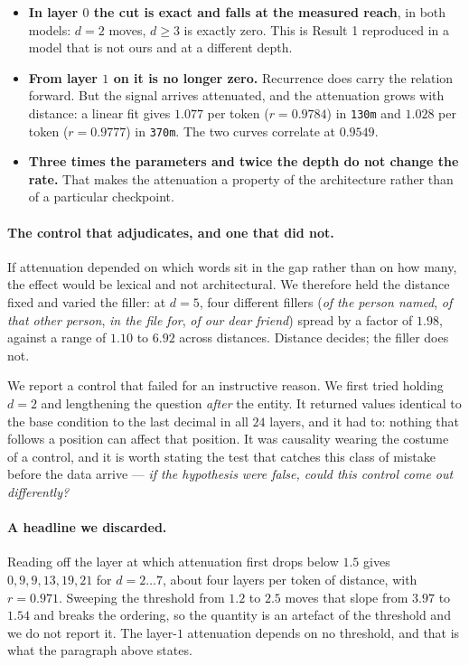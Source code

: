 \documentclass[11pt,a4paper]{article}
\begin{document}
\begin{itemize}
\item \textbf{In layer $0$ the cut is exact and falls at the measured reach}, in both models: $d{=}2$
moves, $d \ge 3$ is exactly zero. This is Result 1 reproduced in a model that is not ours and at a
different depth.
\item \textbf{From layer $1$ on it is no longer zero.} Recurrence does carry the relation forward.
But the signal arrives attenuated, and the attenuation grows with distance: a linear fit gives
$1.077$ per token ($r = 0.9784$) in \texttt{130m} and $1.028$ per token ($r = 0.9777$) in
\texttt{370m}. The two curves correlate at $0.9549$.
\item \textbf{Three times the parameters and twice the depth do not change the rate.} That makes the
attenuation a property of the architecture rather than of a particular checkpoint.
\end{itemize}

\paragraph{The control that adjudicates, and one that did not.} If attenuation depended on which words
sit in the gap rather than on how many, the effect would be lexical and not architectural. We
therefore held the distance fixed and varied the filler: at $d{=}5$, four different fillers
(\emph{of the person named}, \emph{of that other person}, \emph{in the file for}, \emph{of our dear
friend}) spread by a factor of $1.98$, against a range of $1.10$ to $6.92$ across distances. Distance
decides; the filler does not.

We report a control that failed for an instructive reason. We first tried holding $d{=}2$ and
lengthening the question \emph{after} the entity. It returned values identical to the base condition
to the last decimal in all $24$ layers, and it had to: nothing that follows a position can affect that
position. It was causality wearing the costume of a control, and it is worth stating the test that
catches this class of mistake before the data arrive --- \emph{if the hypothesis were false, could
this control come out differently?}

\paragraph{A headline we discarded.} Reading off the layer at which attenuation first drops below
$1.5$ gives $0, 9, 9, 13, 19, 21$ for $d = 2 \ldots 7$, about four layers per token of distance, with
$r = 0.971$. Sweeping the threshold from $1.2$ to $2.5$ moves that slope from $3.97$ to $1.54$ and
breaks the ordering, so the quantity is an artefact of the threshold and we do not report it. The
layer-$1$ attenuation depends on no threshold, and that is what the paragraph above states.
\end{document}
